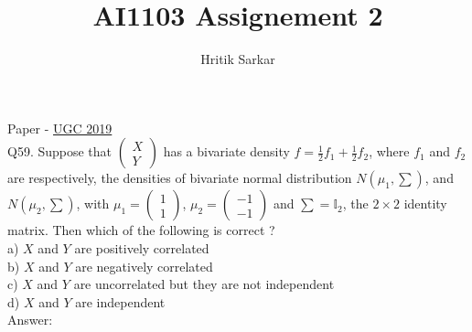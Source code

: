 \documentclass{article}
\title{AI1103 Assignement 2}
\author{Hritik Sarkar}
\theoremstyle{remark}
\begin{document}
\maketitle
Paper - \href{https://github.com/gadepall/papers/blob/master/ugc/math/2019.pdf}{UGC 2019}
\newline
\\ Q59. Suppose that $\begin{pmatrix} X\\ Y \end{pmatrix}$ has a bivariate density $f = \frac{1}{2}f_1 + \frac{1}{2}f_2$, where $f_1$ and $f_2$ are respectively, the densities of bivariate normal distribution $N(\mu_{1},\sum)$, and $N(\mu_{2},\sum)$, with $\mu_{1} = \begin{pmatrix} 1 \\ 1 \end{pmatrix}$, $\mu_{2} = \begin{pmatrix} -1 \\ -1 \end{pmatrix}$ and $\sum = \mathbb{I}_{2}$, the $2 \times 2$ identity matrix. Then which of the following is correct ?
\newline
\\a) $X$ and $Y$ are positively correlated
\\b) $X$ and $Y$ are negatively correlated
\\c) $X$ and $Y$ are uncorrelated but they are not independent
\\d) $X$ and $Y$ are independent
\newline
\\ Answer:
\newline
\end{document}
